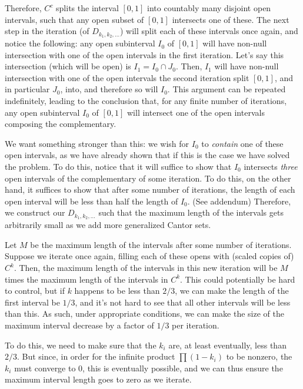\documentclass{article}
\begin{document}
	Therefore, $C^c$ splits the interval $[0,1]$ into countably many disjoint open intervals, such that any open subset of $[0,1]$ intersects one of these. The next step in the iteration (of $D_{k_1, k_2, \ldots}$) will split each of these intervals once again, and notice the following: any open subinterval $I_0$ of $[0,1]$ will have non-null intersection with one of the open intervals in the first iteration. Let's say this intersection (which will be open) is $I_1 = I_0 \cap J_0$. Then, $I_1$ will have non-null intersection with one of the open intervals the second iteration split $[0,1]$, and in particular $J_0$, into, and therefore so will $I_0$. This argument can be repeated indefinitely, leading to the conclusion that, for any finite number of iterations, any open subinterval $I_0$ of $[0,1]$ will intersect one of the open intervals composing the complementary.
	
	We want something stronger than this: we wish for $I_0$ to \emph{contain} one of these open intervals, as we have already shown that if this is the case we have solved the problem. To do this, notice that it will suffice to show that $I_0$ intersects \emph{three} open intervals of the complementary of some iteration. To do this, on the other hand, it suffices to show that after some number of iterations, the length of each open interval will be less than half the length of $I_0$. (See addendum) Therefore, we construct our $D_{k_1, k_2, \ldots}$ such that the maximum length of the intervals gets arbitrarily small as we add more generalized Cantor sets.
	
	Let $M$ be the maximum length of the intervals after some number of iterations. Suppose we iterate once again, filling each of these opens with (scaled copies of) $C^k$. Then, the maximum length of the intervals in this new iteration will be $M$ times the maximum length of the intervals in $C^k$. This could potentially be hard to control, but if $k$ happens to be less than $2/3$, we can make the length of the first interval be $1/3$, and it's not hard to see that all other intervals will be less than this. As such, under appropriate conditions, we can make the size of the maximum interval decrease by a factor of $1/3$ per iteration.
	
	To do this, we need to make sure that the $k_i$ are, at least eventually, less than $2/3$. But since, in order for the infinite product $\prod (1 - k_i)$ to be nonzero, the $k_i$ must converge to 0, this is eventually possible, and we can thus ensure the maximum interval length goes to zero as we iterate.
	
\end{document}
